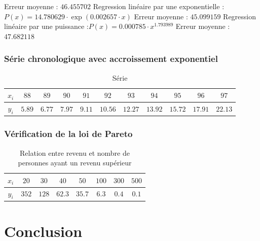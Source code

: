 \documentclass{report}
\begin{document}
	Erreur moyenne : $46.455702$
	\newline
	\newline
	Regression linéaire par une exponentielle :$P(x) = 14.780629 \cdot \exp(0.002657 \cdot x)$
	\newline
	Erreur moyenne : $45.099159$
	\newline
	\newline
	Regression linéaire par une puissance :$P(x) = 0.000785  \cdot x^{1.793989}$
	\newline
	Erreur moyenne : $47.682118$
      \newpage
      
      \subsection{Série chronologique avec accroissement exponentiel}
      
	\begin{table}[h]
	  \centering
	  \begin{tabular}{| c | c | c | c | c | c | c | c | c | c | c |}
	    \hline 
	    $x_{i}$ & $88$ & $89$ & $90$ & $91$ & $92$ & $93$ & $94$ & $95$ & $96$ & $97$ \\ 
	    \hline 
	    $y_{i}$ & $5.89$ & $6.77$ & $7.97$ & $9.11$ & $10.56$ & $12.27$ & $13.92$ & $15.72$ & $17.91$ & $22.13$ \\ 
	    \hline 
	  \end{tabular}
	  \caption{Série}
	  \label{approx_tp2_ex4}
	\end{table}
      \newpage
      
      \subsection{Vérification de la loi de Pareto}
	\begin{table}[h]
	  \centering
	  \begin{tabular}{| c | c | c | c | c | c | c | c |}
	      \hline 
	      $x_{i}$ & $20$ & $30$ & $40$ & $50$ & $100$ & $300$ & $500$ \\ 
	      \hline 
	      $y_{i}$ & $352$ & $128$ & $62.3$ & $35.7$ & $6.3$ & $0.4$ & $0.1$ \\ 
	      \hline 
	  \end{tabular}
	  \caption{Relation entre revenu et nombre de personnes ayant un revenu supérieur}
	  \label{approx_tp2_ex5}
	\end{table}
  \chapter{Conclusion}
\end{document}
